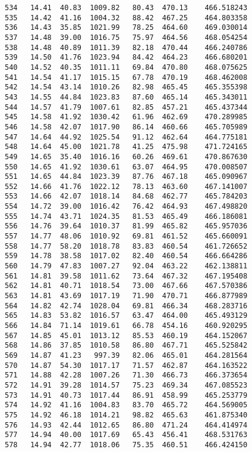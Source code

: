 \documentclass[11pt]{article}
\begin{document}
\begin{tcolorbox}[breakable, size=fbox, boxrule=.5pt, pad at break*=1mm, opacityfill=0]
\begin{Verbatim}[commandchars=\\\{\}]
534   14.41  40.83  1009.82   80.43  470.13    466.518243
535   14.42  41.16  1004.32   88.42  467.25    464.803358
536   14.43  35.85  1021.99   78.25  464.60    469.030014
537   14.48  39.00  1016.75   75.97  464.56    468.054254
538   14.48  40.89  1011.39   82.18  470.44    466.240786
539   14.50  41.76  1023.94   84.42  464.23    466.680201
540   14.52  40.35  1011.11   69.84  470.80    468.075625
541   14.54  41.17  1015.15   67.78  470.19    468.462008
542   14.54  43.14  1010.26   82.98  465.45    465.355398
543   14.55  44.84  1023.83   87.60  465.14    465.343011
544   14.57  41.79  1007.61   82.85  457.21    465.437344
545   14.58  41.92  1030.42   61.96  462.69    470.289985
546   14.58  42.07  1017.90   86.14  460.66    465.705989
547   14.64  44.92  1025.54   91.12  462.64    464.775181
548   14.64  45.00  1021.78   41.25  475.98    471.724165
549   14.65  35.40  1016.16   60.26  469.61    470.867630
550   14.65  41.92  1030.61   63.07  464.95    470.008507
551   14.65  44.84  1023.39   87.76  467.18    465.090967
552   14.66  41.76  1022.12   78.13  463.60    467.141007
553   14.66  42.07  1018.14   84.68  462.77    465.784203
554   14.72  39.00  1016.42   76.42  464.93    467.498820
555   14.74  43.71  1024.35   81.53  465.49    466.186081
556   14.76  39.64  1010.37   81.99  465.82    465.957036
557   14.77  48.06  1010.92   69.81  461.52    465.660091
558   14.77  58.20  1018.78   83.83  460.54    461.726652
559   14.78  38.58  1017.02   82.40  460.54    466.664286
560   14.79  47.83  1007.27   92.04  463.22    462.138811
561   14.81  39.58  1011.62   73.64  467.32    467.195408
562   14.81  40.71  1018.54   73.00  467.66    467.570386
563   14.81  43.69  1017.19   71.90  470.71    466.877989
564   14.82  42.74  1028.04   69.81  466.34    468.283716
565   14.83  53.82  1016.57   63.47  464.00    465.493129
566   14.84  71.14  1019.61   66.78  454.16    460.920295
567   14.85  45.01  1013.12   85.53  460.19    464.152067
568   14.86  37.85  1010.58   86.80  467.71    465.525842
569   14.87  41.23   997.39   82.06  465.01    464.281564
570   14.87  54.30  1017.17   71.57  462.87    464.163522
571   14.88  42.28  1007.26   71.30  466.73    466.373654
572   14.91  39.28  1014.57   75.23  469.34    467.085523
573   14.91  40.73  1017.44   86.91  458.99    465.253779
574   14.92  41.16  1004.83   83.70  465.72    464.569005
575   14.92  46.18  1014.21   98.82  465.63    461.875340
576   14.93  42.44  1012.65   86.80  471.24    464.414974
577   14.94  40.00  1017.69   65.43  456.41    468.531763
578   14.94  42.77  1018.06   75.35  460.51    466.424150

\end{Verbatim}
\end{tcolorbox}
\end{document}
